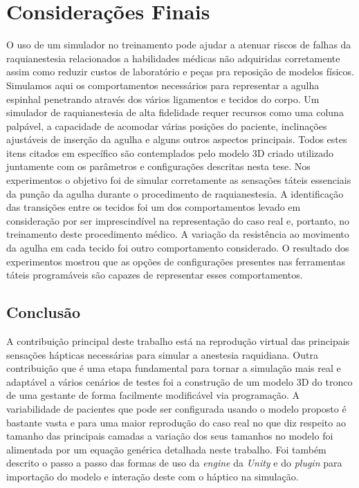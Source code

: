\chapter{Considerações Finais} \label{cap:cap6}

O uso de um simulador no treinamento pode ajudar a atenuar riscos de falhas da raquianestesia relacionados a habilidades médicas não adquiridas corretamente assim como reduzir custos de laboratório e peças pra reposição de modelos físicos. Simulamos aqui os comportamentos necessários para representar a agulha espinhal penetrando através dos vários ligamentos e tecidos do corpo. Um simulador de raquianestesia de alta fidelidade requer recursos como uma coluna palpável, a capacidade de acomodar várias posições do paciente, inclinações ajustáveis de inserção da agulha e alguns outros aspectos principais. Todos estes itens citados em específico são contemplados pelo modelo 3D criado utilizado juntamente com os parâmetros e configurações descritas nesta tese. Nos experimentos o objetivo foi de simular corretamente as sensações táteis essenciais da punção da agulha durante o procedimento de raquianestesia. A identificação das transições entre os tecidos foi um dos comportamentos levado em consideração por ser imprescindível na representação do caso real e, portanto, no treinamento deste procedimento médico.
A variação da resistência ao movimento da agulha em cada tecido foi outro comportamento considerado. O resultado dos experimentos mostrou que as opções de configurações presentes nas ferramentas táteis programáveis são capazes de representar esses comportamentos.

\section{Conclusão}
\label{sec:conclusão}

A contribuição principal deste trabalho está na reprodução virtual das principais sensações hápticas necessárias para simular a anestesia raquidiana. Outra contribuição que é uma etapa fundamental para tornar a simulação mais real e adaptável a vários cenários de testes foi a construção de um modelo 3D do tronco de uma gestante de forma facilmente modificável via programação. A variabilidade de pacientes que pode ser configurada usando o modelo proposto é bastante vasta e para uma maior reprodução do caso real no que diz respeito ao tamanho das principais camadas a variação dos seus tamanhos no modelo foi alimentada por um equação genérica detalhada neste trabalho. Foi também descrito o passo a passo das formas de uso da \textit{engine} da \textit{Unity} e do \textit{plugin} para importação do modelo e interação deste com o háptico na simulação. 


